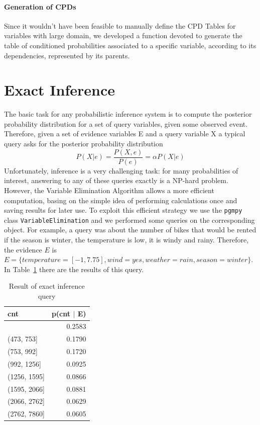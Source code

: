 \documentclass[letterpaper,11pt]{article}
\begin{document}
\paragraph{Generation of CPDs}
Since it wouldn't have been feasible to manually define the CPD Tables for variables with large
domain, we developed a function devoted to generate the table of conditioned probabilities associated
to a specific variable, according to its dependencies, represented by its parents.

\section{Exact Inference}

The basic task for any probabilistic inference system is to compute the posterior
 probability distribution for a set of query variables, given some observed event. Therefore, 
 given a set of evidence variables E and a query variable X a typical query asks for the posterior probability distribution 
\begin{equation}
P(X| e) = \frac{P(X, e)}{P(e)} = \alpha P(X| e) 
\end{equation}
Unfortunately, inference is a very challenging task: for many probabilities of interest, 
answering to any of these queries exactly is a NP-hard problem. However, the Variable 
Elimination Algorithm allows a more efficient computation, basing on the simple idea of
 performing calculations once and saving results for later use. To exploit this 
 efficient strategy we use the \texttt{pgmpy} class \texttt{VariableElimination}
and we performed some queries on the corresponding object. For example, a query was 
about the number of bikes that would be rented if the season is winter, the temperature is low, 
it is windy and rainy. Therefore, the evidence $E$ is $E = \{temperature = [-1, 7.75], wind = yes, weather = rain, season = winter\}$.
In Table~\ref{tab:exact-inference} there are the results of this query.

\begin{table}
  \centering
  \begin{tabular}[]{l r}
    \hline
    \textbf{cnt} & \textbf{p(cnt $|$ E)}\\
    \hline
    [47, 273] & 0.2583 \\
    (473, 753] & 0.1790 \\
    (753, 992] & 0.1720 \\
    (992, 1256] & 0.0925 \\
    (1256, 1595] & 0.0866 \\
    (1595, 2066] & 0.0881 \\
    (2066, 2762] & 0.0629 \\
    (2762, 7860] & 0.0605 \\
    \hline
  \end{tabular}
  \caption{Result of exact inference query}
  \label{tab:exact-inference}
\end{table}
\end{document}
